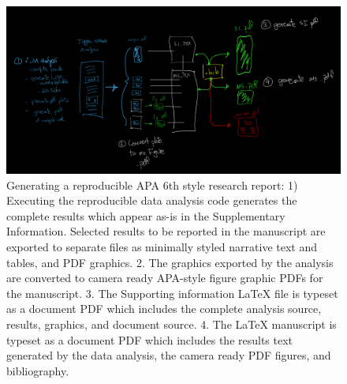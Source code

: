 \documentclass[helv,10pt,man,floatsintext]{apa6}  %
\begin{document}
\begin{figure}[ht]
\caption{Generating a reproducible APA 6th style research report: 1)
  Executing the reproducible data analysis code generates the complete
  results which appear as-is in the Supplementary
  Information. Selected results to be reported in the manuscript are
  exported to separate files as minimally styled narrative text and
  tables, and PDF graphics. 2. The graphics exported by the analysis
  are converted to camera ready APA-style figure graphic PDFs for the
  manuscript. 3. The Supporting information \LaTeX{} file is typeset
  as a document PDF which includes the complete analysis source,
  results, graphics, and document source. 4. The \LaTeX{} manuscript
  is typeset as a document PDF which includes the results text
  generated by the data analysis, the camera ready PDF figures, and
  bibliography.}  
\includegraphics[width=.95\textwidth]{images/report_generation.png}

\end{figure}
\end{document}
